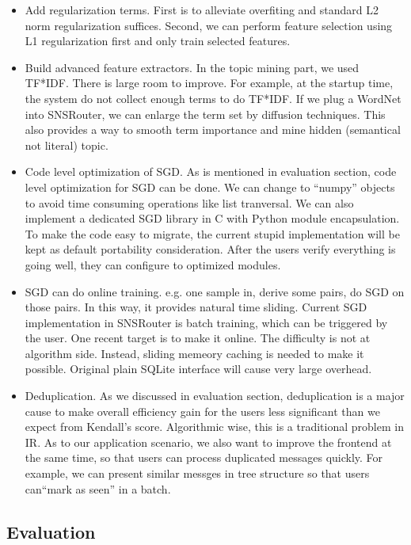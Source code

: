\documentclass{sig-alternate}
\begin{document}
\begin{itemize}
	\item Add regularization terms. 
		First is to alleviate overfiting and standard L2 norm regularization suffices. 
		Second, we can perform feature selection using L1 regularization first 
		and only train selected features. 
	\item Build advanced feature extractors. 
		In the topic mining part, we used TF*IDF. 
		There is large room to improve. 
		For example, at the startup time,
		the system do not collect enough terms to do TF*IDF.
		If we plug a WordNet into SNSRouter, 
		we can enlarge the term set by diffusion techniques. 
		This also provides a way to smooth term importance and 
		mine hidden (semantical not literal) topic. 
	\item Code level optimization of SGD. 
		As is mentioned in evaluation section, 
		code level optimization for SGD can be done. 
		We can change to ``numpy'' objects to avoid 
		time consuming operations like list tranversal. 
		We can also implement a dedicated SGD library in C with Python module encapsulation. 
		To make the code easy to migrate, 
		the current stupid implementation will be kept as default portability consideration. 
		After the users verify everything is going well, 
		they can configure to optimized modules. 
	\item SGD can do online training.
		e.g. one sample in, derive some pairs, do SGD on those pairs.
		In this way, it provides natural time sliding.
		Current SGD implementation in SNSRouter is batch training, 
		which can be triggered by the user. 
		One recent target is to make it online. 
		The difficulty is not at algorithm side. 
		Instead, sliding memeory caching is needed to make it possible. 
		Original plain SQLite interface will cause very large overhead. 
	\item Deduplication. 
		As we discussed in evaluation section, 
		deduplication is a major cause to make overall efficiency gain 
		for the users less significant than we expect from Kendall's score. 
		Algorithmic wise, this is a traditional problem in IR. 
		As to our application scenario, 
		we also want to improve the frontend at the same time, 
		so that users can process duplicated messages quickly. 
		For example, we can present similar messges in tree structure
		so that users can``mark as seen'' in a batch. 
\end{itemize}

\subsection{Evaluation}
\label{sec:fu_Evaluation}
\end{document}
